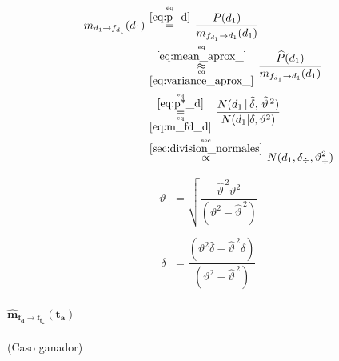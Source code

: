\documentclass[article]{jss}
\newcommand\hfrac[2]{\genfrac{}{}{0pt}{}{#1}{#2}} %
\begin{document}
\begin{appendix}
\begin{equation}\label{eq:m^_d_fd}
\begin{split}
 m_{d_1 \rightarrow f_{d_1}}(d_1) &\overset{\hfrac{\text{eq}}{\ref{eq:p_d}}}{=} \frac{P(d_1)}{m_{f_{d_1} \rightarrow d_1}(d_1)} \\
 &\overset{\hfrac{\text{eq}}{\ref{eq:mean_aprox_}}}{\underset{\hfrac{\text{eq}}{\ref{eq:variance_aprox_}}}{\approx}} \frac{\widehat{P}(d_1)}{m_{f_{d_1} \rightarrow d_1}(d_1)} \\
 & \overset{\hfrac{\text{eq}}{\ref{eq:p*_d}}}{\underset{\hfrac{\text{eq}}{\ref{eq:m_fd_d}}}{=}}  \frac{N(d_1 \,  | \,\widehat{\delta} , \, \widehat{\vartheta}^{\,2} )}{N(d_1 | \delta, \vartheta^2)} \\
 &\overset{\hfrac{\text{sec}}{\ref{sec:division_normales}}}{\propto} N(d_1,\delta_{\div},\vartheta_{\div}^2 )
\end{split}
\end{equation}

\begin{equation}
 \vartheta_{\div} = \sqrt{\frac{\widehat{\vartheta}^{\,2}\vartheta^2}{(\vartheta^2 - \widehat{\vartheta}^{\,2})}}
\end{equation}

\begin{equation}
 \delta_{\div} = \frac{(\vartheta^2\widehat{\delta} - \widehat{\vartheta}^{\,2}\delta)}{(\vartheta^2 - \widehat{\vartheta}^{\,2})}
\end{equation}

\paragraph{$\bm{\widehat{m}_{f_d \rightarrow f_{t_a}}(t_a)}$} (Caso ganador)


\end{appendix}
\end{document}
